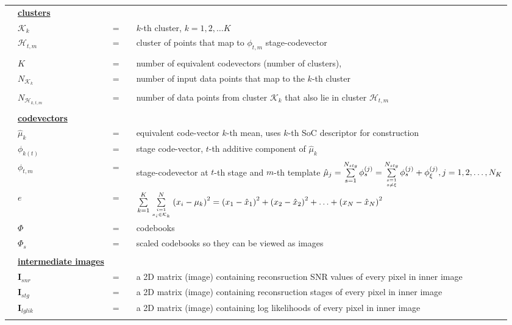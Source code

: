 \documentclass{article}
\begin{document}
\begin{longtable}{llllp{3in}}
&\textbf{\underline{clusters}}&&&																												\\
&$\mathcal{K}_k$			&=&& $k$-th cluster, $k=1, 2, \ldots K$																				\\
&$\mathcal{H}_{t, m}$	&=&& cluster of points that map to $\phi_{t, m}$ stage-codevector													\\\\

&$K$    					&=&& number of equivalent codevectors (number of clusters),  														\\
&$N_{\mathcal{K}_k}$ 	&=&& number of input data points that map to the $k$-th cluster													\\\\
&$N_{\mathcal{H}_{k, t, m}}$	
							&=&& number of data points from cluster $\mathcal{K}_k$ that also lie in cluster $\mathcal{H}_{t, m}$			\\\\

&\textbf{\underline{codevectors}}&&&																											\\
&$\hat{\mu}_k$			&=&& equivalent code-vector $k$-th mean, uses $k$-th SoC descriptor for construction								\\
&$\phi_{k(t)}$				&=&& stage code-vector, $t$-th additive component of $\hat{\mu}_k$												\\
&$\phi_{t, m}$			&=&& stage-codevector at $t$-th stage and $m$-th template  $\hat{\mu}_j=\sum\limits_{s=1}^{N_{stg}}\phi_s^{(j)} = \sum\limits_{s=1 \atop s \neq \xi}^{N_{stg}}\phi_s^{(j)} + \phi_\xi^{(j)}, j={1, 2, \dots, N_K}$														\\
&$e$						&=&&$\sum\limits_{k=1}^K \sum\limits_{{i=1 \atop x_i \in \mathcal{K}_k}}^N {(x_i - \mu_k)}^2 = {(x_1 - \hat{x}_1)}^2 + {(x_2 - \hat{x}_2)}^2 + \ldots + {(x_N - \hat{x}_N)}^2$ 																										\\
&$\Phi$					&=&& codebooks																										\\
&$\Phi_s$					&=&& scaled codebooks so they can be viewed as images															\\\\



&\textbf{\underline{intermediate images}}&&&																									\\
&$\mathbf{I}_{snr}$			&=&& a 2D matrix (image) containing reconsruction SNR values of every pixel in inner image					\\
&$\mathbf{I}_{stg}$			&=&& a 2D matrix (image) containing reconsruction stages of every pixel in inner image						\\
&$\mathbf{I}_{lglik}$			&=&& a 2D matrix (image) containing log likelihoods of every pixel in inner image								\\\\




\end{longtable}
\end{document}
